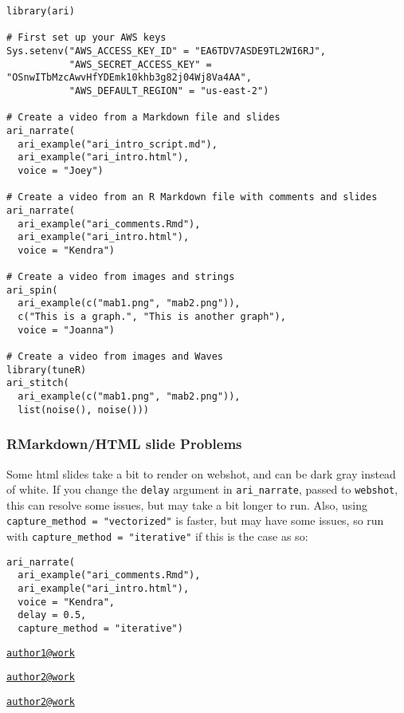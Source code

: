 \begin{verbatim}
library(ari)

# First set up your AWS keys
Sys.setenv("AWS_ACCESS_KEY_ID" = "EA6TDV7ASDE9TL2WI6RJ",
           "AWS_SECRET_ACCESS_KEY" = "OSnwITbMzcAwvHfYDEmk10khb3g82j04Wj8Va4AA",
           "AWS_DEFAULT_REGION" = "us-east-2")

# Create a video from a Markdown file and slides
ari_narrate(
  ari_example("ari_intro_script.md"),
  ari_example("ari_intro.html"),
  voice = "Joey")

# Create a video from an R Markdown file with comments and slides
ari_narrate(
  ari_example("ari_comments.Rmd"),
  ari_example("ari_intro.html"),
  voice = "Kendra")

# Create a video from images and strings
ari_spin(
  ari_example(c("mab1.png", "mab2.png")),
  c("This is a graph.", "This is another graph"),
  voice = "Joanna")

# Create a video from images and Waves
library(tuneR)
ari_stitch(
  ari_example(c("mab1.png", "mab2.png")),
  list(noise(), noise()))
\end{verbatim}

\hypertarget{rmarkdownhtml-slide-problems}{%
\subsubsection{RMarkdown/HTML slide
Problems}\label{rmarkdownhtml-slide-problems}}

Some html slides take a bit to render on webshot, and can be dark gray
instead of white. If you change the \texttt{delay} argument in
\texttt{ari\_narrate}, passed to \texttt{webshot}, this can resolve some
issues, but may take a bit longer to run. Also, using
\texttt{capture\_method\ =\ "vectorized"} is faster, but may have some
issues, so run with \texttt{capture\_method\ =\ "iterative"} if this is
the case as so:

\begin{verbatim}
ari_narrate(
  ari_example("ari_comments.Rmd"),
  ari_example("ari_intro.html"),
  voice = "Kendra",
  delay = 0.5,
  capture_method = "iterative")
\end{verbatim}




\address{%
Sean Kross\\
UCSD\\
line 1\\ line 2\\
}
\href{mailto:author1@work}{\nolinkurl{author1@work}}

\address{%
John Muschelli\\
Affiliation\\
line 1\\ line 2\\
}
\href{mailto:author2@work}{\nolinkurl{author2@work}}

\address{%
Jeffrey T. Leek\\
Affiliation\\
line 1\\ line 2\\
}
\href{mailto:author2@work}{\nolinkurl{author2@work}}


